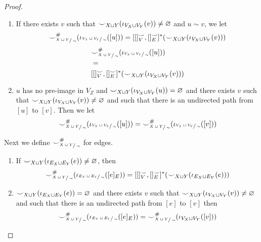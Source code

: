 \begin{proof}
	\begin{enumerate}
		\item If there exists $v$ such that ${\smile}_{X\sqcup Y}(\iota_{V_{X} \sqcup  V_{Y}}(v)) \not = \varnothing$ and $u \sim v$, we let
		      \ifdefined \ONECOLUMN
			      \[
				      {\smile}_{\sfrac{X\sqcup Y}{\sim}}^{{\#}}(\iota_{\sfrac{V_{X} \sqcup  V_{Y}}{\sim}}([u]))
				      =
				      [[]_{V}^{{\smile}},[]_{E}^{{\smile}}]^{*}({\smile}_{X\sqcup Y}(\iota_{V_{X} \sqcup  V_{Y}}(v)))
			      \]
		      \else
			      \begin{align*}
				       & {\smile}_{\sfrac{X\sqcup Y}{\sim}}^{{\#}}(\iota_{\sfrac{V_{X} \sqcup  V_{Y}}{\sim}}([u]))           \\
				       & =                                                                                               \\
				       & [[]_{V}^{{\smile}},[]_{E}^{{\smile}}]^{*}({\smile}_{X\sqcup Y}(\iota_{V_{X} \sqcup  V_{Y}}(v)))
			      \end{align*}
		      \fi
		\item $u$ has no pre-image in $V_{Z}$ and ${\smile}_{X\sqcup Y}(\iota_{V_{X} \sqcup  V_{Y}}(u)) = \varnothing$ and there exists $v$ such that ${\smile}_{X\sqcup Y}(\iota_{V_{X} \sqcup  V_{Y}}(v)) \not = \varnothing$ and such that there is an undirected path from $[u]$ to $[v]$.
		      Then we let
		      \[
			      {\smile}_{\sfrac{X\sqcup Y}{\sim}}^{{\#}}(\iota_{\sfrac{V_{X} \sqcup  V_{Y}}{\sim}}([u])) = {\smile}_{\sfrac{X\sqcup Y}{\sim}}^{{\#}}(\iota_{\sfrac{V_{X} \sqcup  V_{Y}}{\sim}}([v]))
		      \]
	\end{enumerate}

	Next we define ${\smile}_{\sfrac{X\sqcup Y}{\sim}}^{{\#}}$ for edges.

	\begin{enumerate}
		\item If ${\smile}_{X\sqcup Y}(\iota_{E_{X} \sqcup  E_{Y}}(e)) \not = \varnothing$, then
		      \begin{align*}
			      {\smile}_{\sfrac{X\sqcup Y}{\sim}}^{{\#}}(\iota_{\sfrac{E_{X} \sqcup  E_{Y}}{\sim}}([e]_{E})) =
			      [[]_{V}^{{\smile}}, []_{E}^{{\smile}}]^{*}({\smile}_{X\sqcup Y}(\iota_{E_{X} \sqcup  E_{Y}}(e)))
		      \end{align*}
		\item ${\smile}_{X\sqcup Y}(\iota_{E_{X} \sqcup  E_{Y}}(e)) = \varnothing$ and there exists $v$ such that ${\smile}_{X\sqcup Y}(\iota_{V_{X} \sqcup  V_{Y}}(v)) \not = \varnothing$ and such that there is an undirected path from $[e]$ to $[v]$
		      then
		      \[
			      {\smile}_{\sfrac{X\sqcup Y}{\sim}}^{{\#}}(\iota_{\sfrac{E_{X} \sqcup  E_{Y}}{\sim}}([e]_{E})) = {\smile}_{\sfrac{X\sqcup Y}{\sim}}^{{\#}}(\iota_{V_{X} \sqcup  V_{Y}}([v]))
		      \]
	\end{enumerate}


\end{proof}
